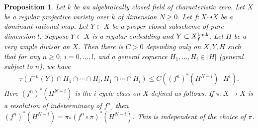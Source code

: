 \documentclass[12pt]{amsart}
\theoremstyle{plain}
\newtheorem{proposition}[theorem]{Proposition}
\theoremstyle{definition}
\numberwithin{equation}{section}
\begin{document}
\begin{proposition}\label{prop:boundoftaudyn}
Let $k$ be an algebraically closed field of characteristic zero.
Let $X$ be a regular projective variety over $k$ of dimension $N \geq 0$.
Let $f \colon X \dashrightarrow X$ be a dominant rational map.
Let $Y \subset X$ be a proper closed subscheme of pure dimension $l$.
Suppose $Y \subset X$ is a regular embedding and $Y \subset X_{f}^{\rm back}$.
Let $H$ be a very ample divisor on $X$.
Then there is $C > 0$ depending only on $X, Y, H$ such that
for any $n \geq 0$, $i=0,\dots, l$, and a general sequence $H_{1}, \dots, H_{i} \in |H|$
(general subject to $n$), we have
\begin{align}
\tau(f^{-n}(Y) \cap H_{1} \cap \cdots \cap H_{i}, H_{1} \cap \cdots \cap H_{i}) \leq C ((f^{n})^{*} (H^{N-i} )\cdot H^{i}  ).
\end{align}
Here $(f^{n})^{*} (H^{N-i} )$ is the $i$-cycle class on $X$ defined as follows.
If $\pi \colon \widetilde{X} \longrightarrow X$ is a resolution of indeterminacy of $f^{n}$,
then $(f^{n})^{*} (H^{N-i} ) = \pi_{*} (f^{n} \circ \pi)^{*}(H^{N-i})$. This is independent of the choice of $\pi$.
\end{proposition}
\end{document}
